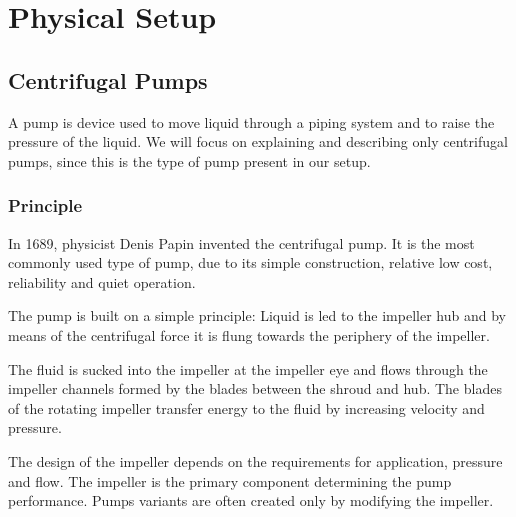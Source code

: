 \chapter{Physical Setup}\label{ch:physsetup}
\section{Centrifugal Pumps}

A pump is device used to move liquid through a piping system and to raise the pressure of the liquid. We will focus on explaining 
and describing only centrifugal pumps, since this is the type of pump present in our setup. 

\subsection{Principle}

In 1689, physicist Denis Papin invented the centrifugal pump. It is the most commonly used type of pump,
due to its simple construction, relative low cost, reliability and quiet operation.

The pump is built on a simple principle: Liquid is led to the impeller hub and by means of the centrifugal force
it is flung towards the periphery of the impeller. 

The fluid is sucked into the impeller at the impeller eye and flows through the impeller channels formed by the 
blades between the shroud and hub.
The blades of the rotating impeller transfer energy to the fluid by increasing velocity and pressure.

The design of the impeller depends on the requirements for application, pressure and flow.
The impeller is the primary component determining the pump performance. 
Pumps variants are often created only by modifying the impeller.




